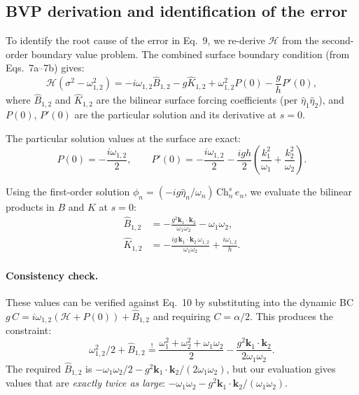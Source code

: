 \documentclass{ol-softwaremanual}
\begin{document}
\subsection{BVP derivation and identification of the error}
\label{app:bvp_derivation}

To identify the root cause of the error in Eq.~9, we re-derive $\mathscr{H}$ from the second-order boundary value problem. The combined surface boundary condition (from Eqs.~7a--7b) gives:
\begin{equation}
\mathscr{H}(\sigma^2 - \omega_{1,2}^2) = -i\omega_{1,2}\hat{B}_{1,2} - g\hat{K}_{1,2} + \omega_{1,2}^2 P(0) - \frac{g}{h}P'(0),
\end{equation}
where $\hat{B}_{1,2}$ and $\hat{K}_{1,2}$ are the bilinear surface forcing coefficients (per $\hat{\eta}_1\hat{\eta}_2$), and $P(0)$, $P'(0)$ are the particular solution and its derivative at $s=0$.

The particular solution values at the surface are exact:
\begin{equation}
P(0) = -\frac{i\omega_{1,2}}{2}, \qquad
P'(0) = -\frac{i\omega_{1,2}}{2} - \frac{igh}{2}\left(\frac{k_1^2}{\omega_1} + \frac{k_2^2}{\omega_2}\right).
\end{equation}

Using the first-order solution $\phi_n = (-ig\hat{\eta}_n/\omega_n)\,\mathrm{Ch}_n^s\,e_n$, we evaluate the bilinear products in $B$ and $K$ at $s=0$:
\begin{align}
\hat{B}_{1,2} &= -\frac{g^2 \mathbf{k}_1\cdot\mathbf{k}_2}{\omega_1\omega_2} - \omega_1\omega_2, \\
\hat{K}_{1,2} &= -\frac{ig\,\mathbf{k}_1\cdot\mathbf{k}_2\,\omega_{1,2}}{\omega_1\omega_2} + \frac{i\omega_{1,2}}{h}.
\end{align}

\paragraph{Consistency check.}
These values can be verified against Eq.~10 by substituting into the dynamic BC
$g\,C = i\omega_{1,2}(\mathscr{H} + P(0)) + \hat{B}_{1,2}$
and requiring $C = \alpha/2$. This produces the constraint:
\begin{equation}
\omega_{1,2}^2/2 + \hat{B}_{1,2} \stackrel{!}{=} \frac{\omega_1^2+\omega_2^2+\omega_1\omega_2}{2} - \frac{g^2\mathbf{k}_1\cdot\mathbf{k}_2}{2\omega_1\omega_2}.
\end{equation}
The required $\hat{B}_{1,2}$ is $-\omega_1\omega_2/2 - g^2\mathbf{k}_1\cdot\mathbf{k}_2/(2\omega_1\omega_2)$, but our evaluation gives values that are \emph{exactly twice as large}: $-\omega_1\omega_2 - g^2\mathbf{k}_1\cdot\mathbf{k}_2/(\omega_1\omega_2)$.
\end{document}
